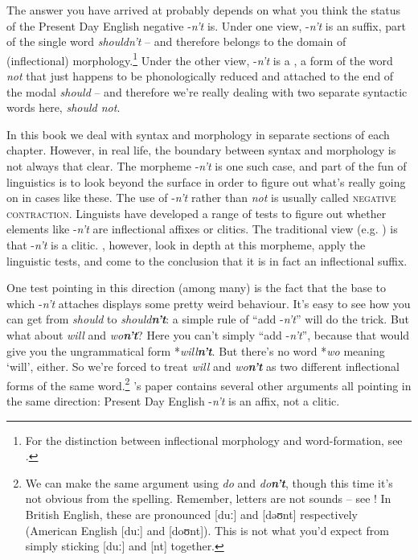 The answer you have arrived at probably depends on what you think the status of the Present Day English negative  -\textit{n't} is. Under one view, -\textit{n't} is an  suffix, part of the single word \textit{shouldn't} -- and therefore belongs to the domain of (inflectional) morphology.\footnote{For the distinction between inflectional morphology and word-formation, see .} Under the other view, -\textit{n't} is a , a form of the word \textit{not} that just happens to be phonologically reduced and attached to the end of the modal \textit{should} -- and therefore we're really dealing with two separate syntactic words here, \textit{should not}.

In this book we deal with syntax and morphology in separate sections of each chapter. However, in real life, the boundary between syntax and morphology is not always that clear. The morpheme -\textit{n't} is one such case, and part of the fun of linguistics is to look beyond the surface in order to figure out what's really going on in cases like these. The use of -\textit{n't} rather than \textit{not} is usually called \textsc{negative contraction}. Linguists have developed a range of tests to figure out whether elements like -\textit{n't} are inflectional affixes or clitics. The traditional view (e.g. \citealp{Zwicky1969}) is that -\textit{n't} is a clitic. \citet{ZwickyPullum1983}, however, look in depth at this morpheme, apply the linguistic tests, and come to the conclusion that it is in fact an inflectional suffix.

One test pointing in this direction (among many) is the fact that the base to which -\textit{n't} attaches displays some pretty weird behaviour. It's easy to see how you can get from \textit{should} to \textit{should\textbf{n't}}: a simple rule of ``add -\textit{n't}'' will do the trick. But what about \textit{will} and \textit{wo\textbf{n't}}? Here you can't simply ``add -\textit{n't}'', because that would give you the ungrammatical form *\textit{will\textbf{n't}}. But there's no word *\textit{wo} meaning `will', either. So we're forced to treat \textit{will} and \textit{wo\textbf{n't}} as two different inflectional forms of the same word.\footnote{We can make the same argument using \textit{do} and \textit{do\textbf{n't}}, though this time it's not obvious from the spelling. Remember, letters are not sounds -- see ! In British English, these are pronounced {[}duː{]} and {[}dəʊnt{]} respectively (American English {[}duː{]} and {[}doʊnt{]}). This is not what you'd expect from simply sticking {[}duː{]} and {[}nt{]} together.} \citeauthor{ZwickyPullum1983}'s paper contains several other arguments all pointing in the same direction: Present Day English -\textit{n't} is an affix, not a clitic.

